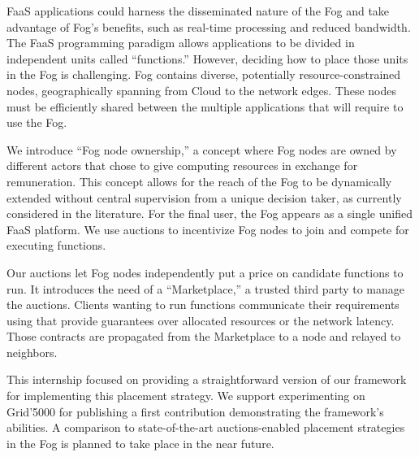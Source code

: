 \Acrfull{FaaS} applications could harness the disseminated nature of the Fog and take advantage of Fog’s benefits, such as real-time processing and reduced bandwidth. The \gls{FaaS} programming paradigm allows applications to be divided in independent units called “functions.” However, deciding how to place those units in the Fog is challenging. Fog contains diverse, potentially resource-constrained nodes, geographically spanning from Cloud to the network edges. These nodes must be efficiently shared between the multiple applications that will require to use the Fog.

We introduce “Fog node ownership,” a concept where Fog nodes are owned by different actors that chose to give computing resources in exchange for remuneration. This concept allows for the reach of the Fog to be dynamically extended without central supervision from a unique decision taker, as currently considered in the literature. For the final user, the Fog appears as a single unified \gls{FaaS} platform. We use auctions to incentivize Fog nodes to join and compete for executing functions.


Our auctions let Fog nodes independently put a price on candidate functions to run. It introduces the need of a “Marketplace,” a trusted third party to manage the auctions. Clients wanting to run functions communicate their requirements using  that provide guarantees over allocated resources or the network latency. Those contracts are propagated from the Marketplace to a node and relayed to neighbors.

This internship focused on providing a straightforward version of our framework for implementing this placement strategy. We support experimenting on Grid'5000 for publishing a first contribution demonstrating the framework's abilities. A comparison to state-of-the-art auctions-enabled placement strategies in the Fog is planned to take place in the near future.

